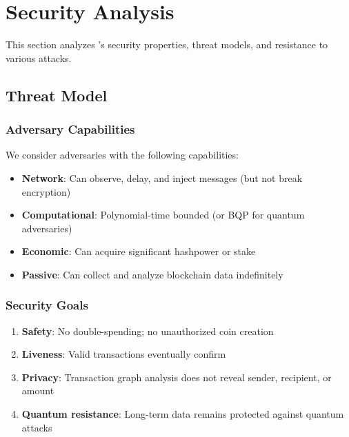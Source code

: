 
\section{Security Analysis}
\label{sec:security}

This section analyzes \Botho's security properties, threat models, and
resistance to various attacks.

\subsection{Threat Model}

\subsubsection{Adversary Capabilities}

We consider adversaries with the following capabilities:

\begin{itemize}
  \item \textbf{Network}: Can observe, delay, and inject messages (but
    not break encryption)
  \item \textbf{Computational}: Polynomial-time bounded (or BQP for
    quantum adversaries)
  \item \textbf{Economic}: Can acquire significant hashpower or stake
  \item \textbf{Passive}: Can collect and analyze blockchain data
    indefinitely
\end{itemize}

\subsubsection{Security Goals}

\begin{enumerate}
  \item \textbf{Safety}: No double-spending; no unauthorized coin creation
  \item \textbf{Liveness}: Valid transactions eventually confirm
  \item \textbf{Privacy}: Transaction graph analysis does not reveal
    sender, recipient, or amount
  \item \textbf{Quantum resistance}: Long-term data remains protected
    against quantum attacks
\end{enumerate}


